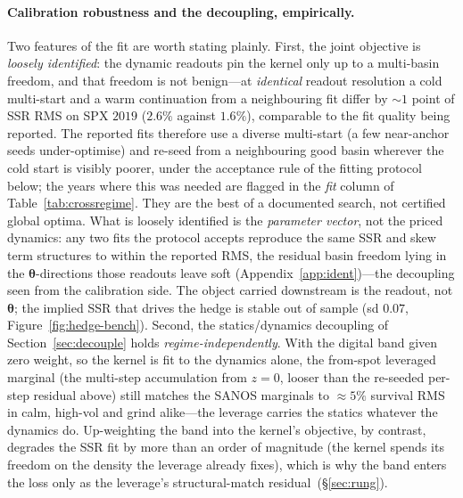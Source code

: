 \documentclass[11pt]{article}
\newcommand{\bth}{{\boldsymbol{\theta}}}
\begin{document}
\paragraph{Calibration robustness and the decoupling, empirically.} Two features of the fit are worth
stating plainly. First, the joint objective is \emph{loosely identified}: the dynamic readouts pin the
kernel only up to a multi-basin freedom, and that freedom is not benign---at \emph{identical} readout
resolution a cold multi-start and a warm continuation from a neighbouring fit differ by ${\sim}1$ point of
SSR RMS on SPX $2019$ ($2.6\%$ against $1.6\%$), comparable to the fit quality being reported. The reported
fits therefore use a diverse multi-start (a few near-anchor seeds under-optimise) and re-seed from a
neighbouring good basin wherever the cold start is visibly poorer, under the acceptance rule of the fitting
protocol below; the years where this was needed are flagged in the \emph{fit} column of
Table~\ref{tab:crossregime}. They are the best of a documented search, not certified global optima. What is
loosely identified is the \emph{parameter vector}, not the priced dynamics: any two fits the protocol accepts
reproduce the same SSR and skew term structures to within the reported RMS, the residual basin freedom lying
in the $\bth$-directions those readouts leave soft (Appendix~\ref{app:ident})---the decoupling seen from the
calibration side. The object carried downstream is the readout, not $\bth$; the implied SSR that drives the
hedge is stable out of sample (sd $0.07$, Figure~\ref{fig:hedge-bench}). Second, the
statics/dynamics decoupling of Section~\ref{sec:decouple} holds \emph{regime-independently}. With the digital
band given zero weight, so the kernel is fit to the dynamics alone, the from-spot leveraged marginal
(the multi-step accumulation from $z{=}0$, looser than the re-seeded per-step residual above) still
matches the SANOS marginals to ${\approx}5\%$ survival RMS in calm, high-vol and grind alike---the leverage
carries the statics whatever the dynamics do. Up-weighting the band into the kernel's objective, by contrast,
degrades the SSR fit by more than an order of magnitude (the kernel spends its freedom on the density the
leverage already fixes), which is why the band enters the loss only as the leverage's structural-match
residual~(\S\ref{sec:rung}).
\end{document}
